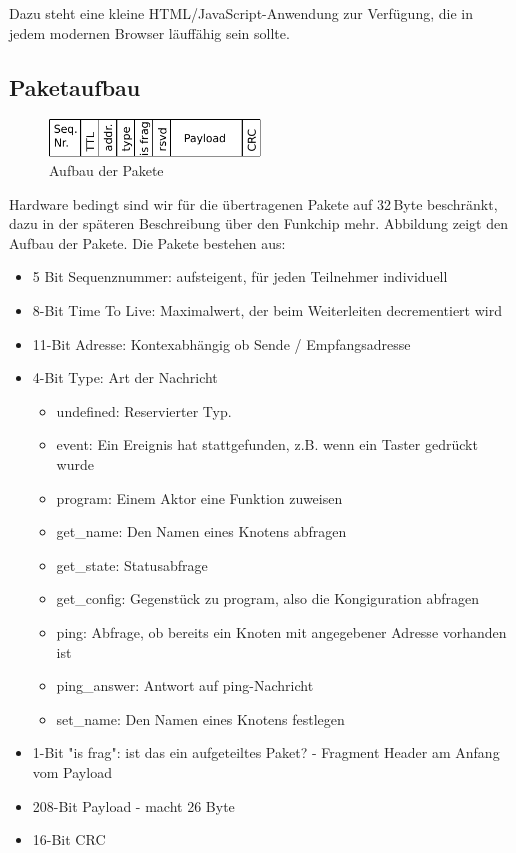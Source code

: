 \documentclass{IEEEtran}
\begin{document}
            Dazu steht eine kleine HTML/JavaScript-Anwendung zur Verfügung,
            die in jedem modernen Browser läuffähig sein sollte.


    
    \subsection{Paketaufbau}
            \begin{figure}
            \centering
            \includegraphics[width=0.5\textwidth]{img/paket}
            \caption{Aufbau der Pakete}
            \label{fig:paket}
        \end{figure}

        Hardware bedingt sind wir für die übertragenen Pakete auf 32\,Byte beschränkt, dazu in der späteren Beschreibung über den Funkchip mehr. Abbildung \label{fig:paket} zeigt den Aufbau der Pakete. Die Pakete bestehen aus:
        \begin{itemize}
            \item 5 Bit Sequenznummer: aufsteigent, für jeden Teilnehmer individuell
            \item 8-Bit Time To Live: Maximalwert, der beim Weiterleiten decrementiert wird
            \item 11-Bit Adresse: Kontexabhängig ob Sende / Empfangsadresse
            \item 4-Bit Type: Art der Nachricht
            \begin{itemize}
                \item undefined: Reservierter Typ.
                \item event: Ein Ereignis hat stattgefunden, z.B. wenn ein Taster gedrückt wurde
                \item program: Einem Aktor eine Funktion zuweisen
                \item get\_name: Den Namen eines Knotens abfragen
                \item get\_state: Statusabfrage
                \item get\_config: Gegenstück zu program, also die Kongiguration abfragen
                \item ping: Abfrage, ob bereits ein Knoten mit angegebener Adresse vorhanden ist
                \item ping\_answer: Antwort auf ping-Nachricht
                \item set\_name: Den Namen eines Knotens festlegen
            \end{itemize}
            \item 1-Bit "is frag": ist das ein aufgeteiltes Paket? - Fragment Header am Anfang vom Payload
            \item 208-Bit Payload - macht 26 Byte
            \item 16-Bit CRC
        \end{itemize}
\end{document}
